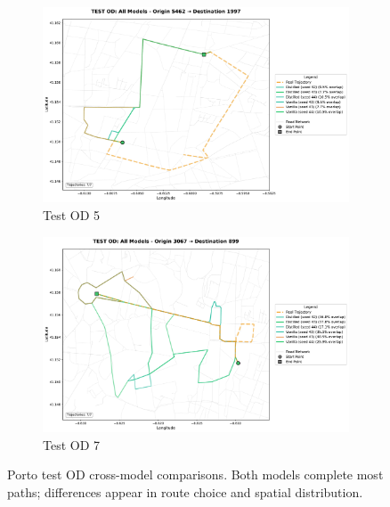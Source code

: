 \begin{figure}[H]
\begin{subfigure}{0.49\linewidth}
        \centering
        \includegraphics[width=\linewidth]{assets/plots/eval/porto/cross_model/test/test_od_comparison_5_origin5462_dest1997.pdf}
        \caption{Test OD 5}
    \end{subfigure}
    \begin{subfigure}{0.49\linewidth}
        \centering
        \includegraphics[width=\linewidth]{assets/plots/eval/porto/cross_model/test/test_od_comparison_7_origin3067_dest899.pdf}
        \caption{Test OD 7}
    \end{subfigure}
    \caption{Porto test OD cross-model comparisons. Both models complete most paths; differences appear in route choice and spatial distribution.}
    \label{fig:appendix-porto-cross-test}
\end{figure}

